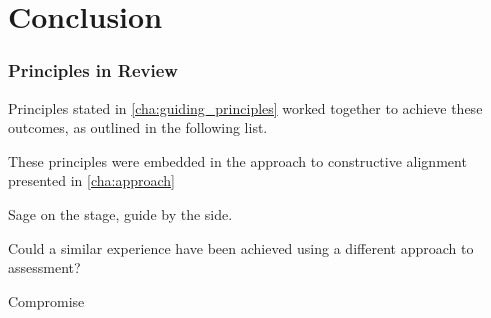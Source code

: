 
\chapter{Conclusion} %
\label{cha:conclusion}

\subsection{Principles in Review} %
\label{sub:principles_in_review}

Principles stated in \cref{cha:guiding_principles} worked together to achieve these outcomes, as outlined in the following list. 

These principles were embedded in the approach to constructive alignment presented in \cref{cha:approach}


Sage on the stage, guide by the side.

Could a similar experience have been achieved using a different approach to assessment?

Compromise




